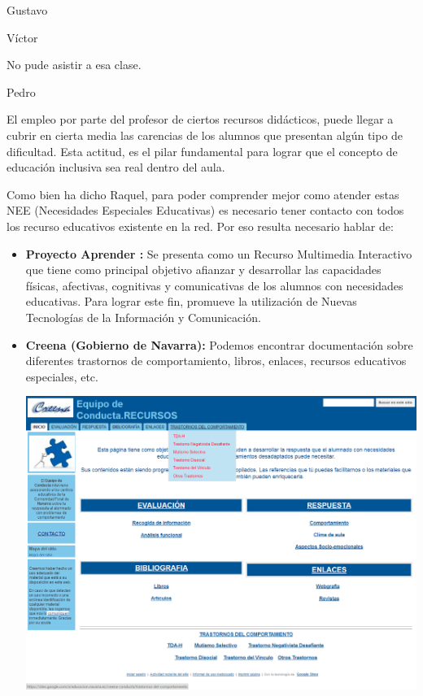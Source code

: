 
\begin{opin}{\guscolor}{Gustavo}

\end{opin}

\begin{opin}{\victorcolor}{Víctor}

No pude asistir a esa clase.

\end{opin}

\begin{opin}{\pedrocolor}{Pedro}

El empleo por parte del profesor de ciertos recursos didácticos, puede llegar a cubrir en cierta media las carencias de los alumnos que presentan algún tipo de dificultad. Esta actitud, es el pilar fundamental para lograr que el concepto de educación inclusiva sea real dentro del aula.

Como bien ha dicho Raquel, para poder comprender mejor como atender estas NEE (Necesidades Especiales Educativas) es necesario tener contacto con todos los recurso educativos existente en la red.  Por eso resulta necesario hablar de:

\begin{itemize}
\item \textbf{ Proyecto Aprender  :} Se presenta como un Recurso Multimedia Interactivo que tiene como principal objetivo afianzar y desarrollar las capacidades físicas, afectivas, cognitivas y comunicativas de los alumnos con necesidades educativas. Para lograr este fin, promueve la utilización de Nuevas Tecnologías de la Información y Comunicación.

\item \textbf{Creena (Gobierno de Navarra):} Podemos encontrar documentación sobre diferentes trastornos de comportamiento, libros, enlaces, recursos educativos especiales, etc.

\begin{minipage}[h]{1.0\linewidth}
\centering
\includegraphics[scale=0.3]{img/tdah_pedro1.png}
\end{minipage}


\end{itemize}
\end{opin}
